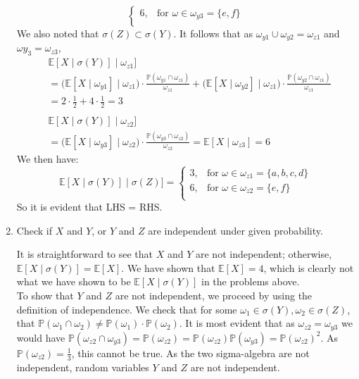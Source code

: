 \documentclass[12pt,twoside, letter]{exam}
\theoremstyle{definition}
\newcommand{\ee}{\mathbb{E}}
\newcommand{\pp}{\mathbb{P}}
\begin{document}
\begin{enumerate}
\begin{solution}
\begin{equation*}
\begin{cases}
              6, & \text{for } \omega \in \omega_{y3} = \{e,f\} \\
            \end{cases}
        \end{equation*}
      We also noted that $\sigma(Z) \subset \sigma(Y)$. It follows that as $\omega_{y1} \cup \omega_{y2} = \omega_{z1}$ and $\omega{y_3} = \omega_{z3}$,
        \begin{align*}
          &\ee[X \mid \sigma(Y)] \mid \omega_{z1}] \\
            &= \big(\ee[X \mid \omega_{y1}]\mid{\omega_{z1}}\big)\cdot \frac{\pp(\omega_{y1}\cap \omega_{z1})}{\omega_{z1}}
            + \big(\ee[X \mid \omega_{y2}]\mid{\omega_{z1}}\big)\cdot \frac{\pp(\omega_{y2}\cap \omega_{z1})}{\omega_{z1}} \\
            &= 2 \cdot \frac{1}{2} + 4\cdot \frac{1}{2} = 3\\
\\
          &\ee[X \mid \sigma(Y)] \mid \omega_{z2}] \\
            &= \big(\ee[X \mid \omega_{y3}]\mid{\omega_{z2}}\big)\cdot \frac{\pp(\omega_{y3}\cap \omega_{z2})}{\omega_{z2}}
            = \ee[X \mid \omega_{z3}] = 6
        \end{align*}
      We then have:
      \begin{equation*}
        \ee[X \mid \sigma(Y)] \mid \sigma(Z)]  =
          \begin{cases}
            3, & \text{for } \omega \in \omega_{z1} = \{a,b,c,d\} \\
            6, & \text{for } \omega \in \omega_{z2} = \{e,f\} \\
          \end{cases}
      \end{equation*}
      So it is evident that LHS = RHS.

    \end{solution}

  \item Check if $X$ and $Y$, or $Y$ and $Z$ are independent under given probability.

    \begin{solution}
      It is straightforward to see that $X$ and $Y$ are not independent; otherwise, $\ee[X\mid \sigma(Y)] = \ee[X]$. We have shown that
      $\ee[X] = 4$, which is clearly not what we have shown to be $\ee[X\mid \sigma(Y)]$ in the problems above. \\
      To show that $Y$ and $Z$ are not independent, we proceed by using the definition of independence. We check that for some $\omega_{1} \in \sigma(Y),
      \omega_2 \in \sigma(Z)$, that $\pp(\omega_1 \cap \omega_2) \neq \pp(\omega_1)\cdot \pp(\omega_2)$. It is most evident that as $\omega_{z2} = \omega_{y3}$
      we would have $\pp(\omega_{z2} \cap \omega_{y3}) = \pp(\omega_{z2}) = \pp(\omega_{z2})\pp(\omega_{y3}) = \pp(\omega_{z2})^2$. As $\pp(\omega_{z2}) = \frac{1}{3}$,
      this cannot be true. As the two sigma-algebra are not independent, random variables $Y$ and $Z$ are not independent.


\end{solution}
\end{enumerate}
\end{document}
